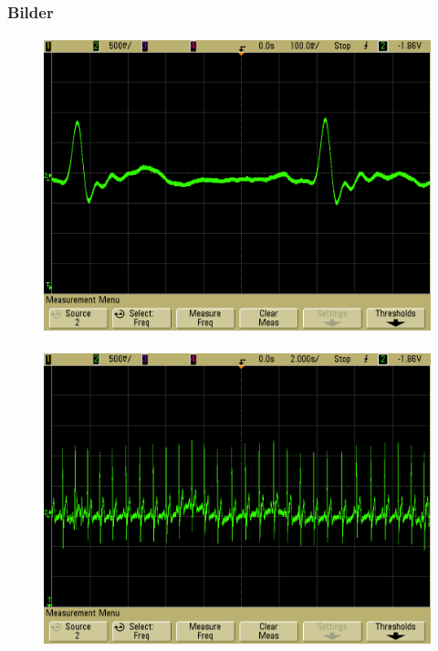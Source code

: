 \begin{frame}
\frametitle{Bilder}
\framesubtitle{}
    \begin{figure}[H]
    \begin{center}
            \includegraphics[]{./img/oszi/scope_13.png}
    \end{center}
    \end{figure}
    
\end{frame}
\framesubtitle{}
    \begin{figure}[H]
    \begin{center}
            \includegraphics[]{./img/oszi/scope_14.png}
    \end{center}
    \end{figure}
    
